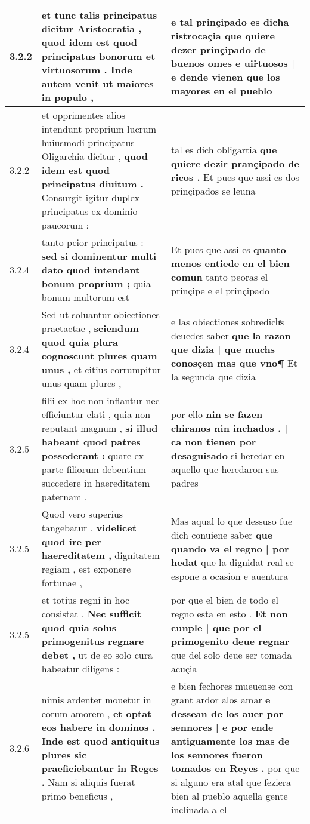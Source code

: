 \begin{tabular}{|p{1cm}|p{6.5cm}|p{6.5cm}|}
3.2.2 & et tunc talis principatus dicitur Aristocratia , \textbf{ quod idem est quod principatus bonorum et virtuosorum . Inde autem venit } ut maiores in populo , & e tal prinçipado es dicħa ristrocaçia \textbf{ que quiere dezer prinçipado de buenos omes e uir̉tuosos | e dende vienen } que los mayores en el pueblo \\\hline
3.2.2 & et opprimentes alios intendunt proprium lucrum huiusmodi principatus Oligarchia dicitur , \textbf{ quod idem est quod principatus diuitum . } Consurgit igitur duplex principatus ex dominio paucorum : & tal es dich obligartia \textbf{ que quiere dezir prançipado de ricos . } Et pues que assi es dos prinçipados se leuna \\\hline
3.2.4 & tanto peior principatus : \textbf{ sed si dominentur multi dato quod intendant bonum proprium ; } quia bonum multorum est & Et pues que assi es \textbf{ quanto menos entiede en el bien comun } tanto peoras el prinçipe e el prinçipado \\\hline
3.2.4 & Sed ut soluantur obiectiones praetactae , \textbf{ sciendum quod quia plura cognoscunt plures quam unus , } et citius corrumpitur unus quam plures , & e las obiectiones sobredichͣs deuedes saber \textbf{ que la razon que dizia | que muchs conosçen mas que vno¶ } Et la segunda que dizia \\\hline
3.2.5 & filii ex hoc non inflantur nec efficiuntur elati , quia non reputant magnum , \textbf{ si illud habeant quod patres possederant : } quare ex parte filiorum debentium succedere in haereditatem paternam , & por ello \textbf{ nin se fazen chiranos nin inchados . | ca non tienen por desaguisado } si heredar en aquello que heredaron sus padres \\\hline
3.2.5 & Quod vero superius tangebatur , \textbf{ videlicet quod ire per haereditatem , } dignitatem regiam , est exponere fortunae , & Mas aqual lo que dessuso fue dich conuiene saber \textbf{ que quando va el regno | por hedat } que la dignidat real se espone a ocasion e auentura \\\hline
3.2.5 & et totius regni in hoc consistat . \textbf{ Nec sufficit quod quia solus primogenitus regnare debet , } ut de eo solo cura habeatur diligens : & por que el bien de todo el regno esta en esto . \textbf{ Et non cunple | que por el primogenito deue regnar } que del solo deue ser tomada acuçia \\\hline
3.2.6 & nimis ardenter mouetur in eorum amorem , \textbf{ et optat eos habere in dominos . Inde est quod antiquitus plures sic praeficiebantur in Reges . } Nam si aliquis fuerat primo beneficus , & e bien fechores mueuense con grant ardor alos amar \textbf{ e dessean de los auer por sennores | e por ende antiguamente los mas de los sennores fueron tomados en Reyes . } por que si alguno era atal que feziera bien al pueblo aquella gente inclinada a el \\\hline

\end{tabular}
